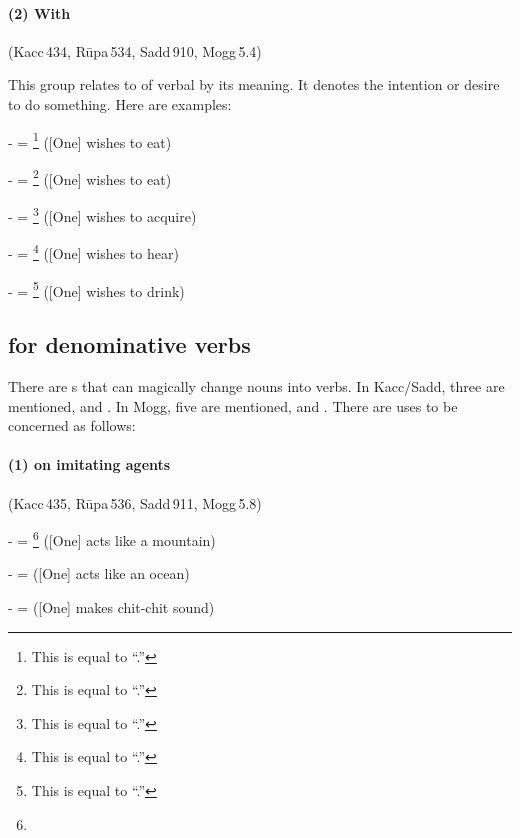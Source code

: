 \paragraph*{(2) With } (Kacc\,434, R\=upa\,534, Sadd\,910, Mogg\,5.4)\par
This group relates to  of verbal  by its meaning. It denotes the intention or desire to do something. Here are examples:\par
-  = \footnote{This is equal to ``.''} ([One] wishes to eat)\par
-  = \footnote{This is equal to ``.''} ([One] wishes to eat)\par
-  = \footnote{This is equal to ``.''} ([One] wishes to acquire)\par
-  = \footnote{This is equal to ``.''} ([One] wishes to hear)\par
-  = \footnote{This is equal to ``.''} ([One] wishes to drink)\par

\subsection*{ for denominative verbs}\label{sec:denomverbs}

There are s that can magically change nouns into verbs. In Kacc/Sadd, three are mentioned,  and . In Mogg, five are mentioned,  and . There are uses to be concerned as follows:

\paragraph*{(1)  on imitating agents} (Kacc\,435, R\=upa\,536, Sadd\,911, Mogg\,5.8)\label{pacca:aaya}\par
-  = \footnote{} ([One] acts like a mountain)\par
-  =  ([One] acts like an ocean)\par
-  =  ([One] makes chit-chit sound)\par


